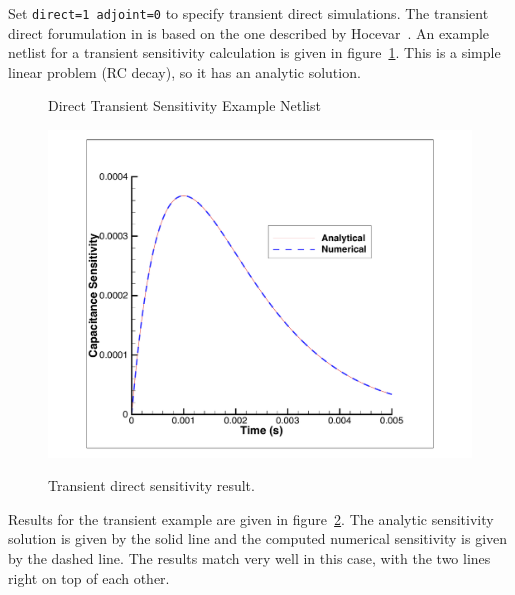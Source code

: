 Set \texttt{direct=1 adjoint=0} to specify transient direct
simulations.  The transient direct forumulation in \Xyce{} is based on
the one described by Hocevar~\cite{Hocevar1985}.  An example netlist
for a transient sensitivity calculation is given in
figure~\ref{Tran_Sensitivity_Netlist}.  This is a simple linear
problem (RC decay), so it has an analytic solution.
\begin{figure}[htbp]
  \begin{centering}
\caption[Direct Transient Sensitivity Example Netlist]
{Direct Transient Sensitivity Example Netlist \label{Tran_Sensitivity_Netlist} }
\end{centering}
\end{figure}
\begin{figure}[ht]
  \centering
  \scalebox{0.5}
  {\includegraphics[]{sens}}
  \caption[Transient direct sensitivity result]
  {Transient direct sensitivity result.
\label{transientSensitivityResult}}
\end{figure}
Results for the transient example are given in figure~\ref{transientSensitivityResult}.
The analytic sensitivity solution is given by the solid line and the computed numerical
sensitivity is given by the dashed line.  The results match very well in this case,
with the two lines right on top of each other.

